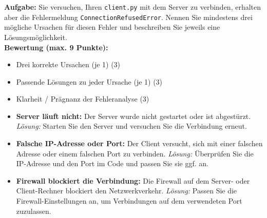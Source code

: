 \begin{myexercise}

    \textbf{Aufgabe:} Sie versuchen, Ihren \texttt{client.py} mit dem Server zu verbinden, erhalten aber die Fehlermeldung \texttt{ConnectionRefusedError}. Nennen Sie mindestens drei mögliche Ursachen für diesen Fehler und beschreiben Sie jeweils eine Lösungsmöglichkeit.
    \\[.5cm]
    \textbf{Bewertung (max. 9 Punkte):}
    \begin{itemize}
        \item Drei korrekte Ursachen (je 1) (3)
        \item Passende Lösungen zu jeder Ursache (je 1) (3)
        \item Klarheit / Prägnanz der Fehleranalyse (3)
    \end{itemize}
    \begin{myanswer}
        \begin{itemize}
            \item \textbf{Server läuft nicht:} Der Server wurde nicht gestartet oder ist abgestürzt. \textit{Lösung:} Starten Sie den Server und versuchen Sie die Verbindung erneut.
            \item \textbf{Falsche IP-Adresse oder Port:} Der Client versucht, sich mit einer falschen Adresse oder einem falschen Port zu verbinden. \textit{Lösung:} Überprüfen Sie die IP-Adresse und den Port im Code und passen Sie sie ggf. an.
            \item \textbf{Firewall blockiert die Verbindung:} Die Firewall auf dem Server- oder Client-Rechner blockiert den Netzwerkverkehr. \textit{Lösung:} Passen Sie die Firewall-Einstellungen an, um Verbindungen auf dem verwendeten Port zuzulassen.
        \end{itemize}
    \end{myanswer}
\end{myexercise}

\newcommand{\blank}[1]{\underline{\hspace{2cm}}}

